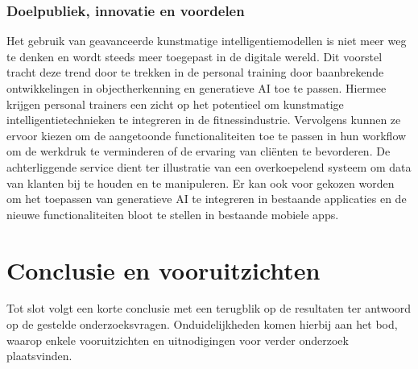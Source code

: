 \subsubsection{Doelpubliek, innovatie en voordelen}
\label{subsubsec:doelpubliek}
Het gebruik van geavanceerde kunstmatige intelligentiemodellen is niet meer weg te denken en wordt steeds meer toegepast in de digitale wereld.
Dit voorstel tracht deze trend door te trekken in de personal training door baanbrekende ontwikkelingen in objectherkenning en generatieve AI toe te passen.
Hiermee krijgen personal trainers een zicht op het potentieel om kunstmatige intelligentietechnieken te integreren in de fitnessindustrie.
Vervolgens kunnen ze ervoor kiezen om de aangetoonde functionaliteiten toe te passen in hun workflow om de werkdruk te verminderen of de ervaring van cli\"enten te bevorderen.
De achterliggende service dient ter illustratie van een overkoepelend systeem om data van klanten bij te houden en te manipuleren.
Er kan ook voor gekozen worden om het toepassen van generatieve AI te integreren in bestaande applicaties en de nieuwe functionaliteiten bloot te stellen in bestaande mobiele apps.

\section{Conclusie en vooruitzichten}
\label{sec:conclusie-en-vooruitzichten}
Tot slot volgt een korte conclusie met een terugblik op de resultaten ter antwoord op de gestelde onderzoeksvragen.
Onduidelijkheden komen hierbij aan het bod, waarop enkele vooruitzichten en uitnodigingen voor verder onderzoek plaatsvinden.